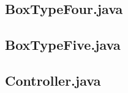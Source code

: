 \documentclass[12pt]{article}
\begin{document}
\subsection{BoxTypeFour.java}

\newpage
\subsection{BoxTypeFive.java}

\subsection{Controller.java}

\newpage
\printbibliography[title=References]
\end{document}
